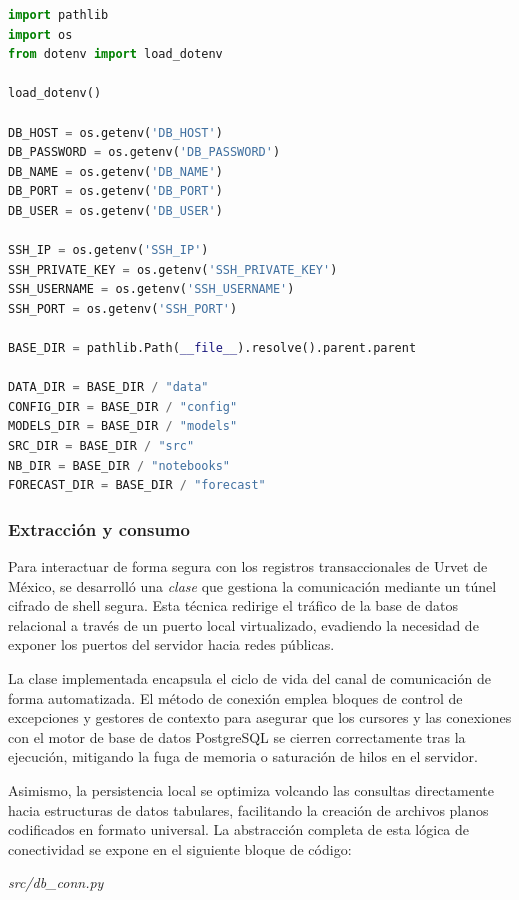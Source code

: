 \documentclass[11pt,a4paper]{report}
\begin{document}
        \begin{lstlisting}[language=Python, caption=Configuración de entornos y rutas globales en settings.py.]
import pathlib
import os
from dotenv import load_dotenv

load_dotenv()

DB_HOST = os.getenv('DB_HOST')
DB_PASSWORD = os.getenv('DB_PASSWORD')
DB_NAME = os.getenv('DB_NAME')
DB_PORT = os.getenv('DB_PORT')
DB_USER = os.getenv('DB_USER')

SSH_IP = os.getenv('SSH_IP')
SSH_PRIVATE_KEY = os.getenv('SSH_PRIVATE_KEY')
SSH_USERNAME = os.getenv('SSH_USERNAME')
SSH_PORT = os.getenv('SSH_PORT')

BASE_DIR = pathlib.Path(__file__).resolve().parent.parent

DATA_DIR = BASE_DIR / "data"
CONFIG_DIR = BASE_DIR / "config"
MODELS_DIR = BASE_DIR / "models"
SRC_DIR = BASE_DIR / "src"
NB_DIR = BASE_DIR / "notebooks"
FORECAST_DIR = BASE_DIR / "forecast"
        \end{lstlisting}

    \subsubsection{Extracción y consumo}
    Para interactuar de forma segura con los registros transaccionales de Urvet de México,
    se desarrolló una \textit{clase} que gestiona la comunicación mediante un túnel cifrado de shell segura.
    Esta técnica redirige el tráfico de la base de datos relacional a través de un puerto local virtualizado,
    evadiendo la necesidad de exponer los puertos del servidor hacia redes públicas.

    La clase implementada encapsula el ciclo de vida del canal de comunicación de forma automatizada.
    El método de conexión emplea bloques de control de excepciones y gestores de contexto para asegurar que los cursores y
    las conexiones con el motor de base de datos PostgreSQL se cierren correctamente tras la ejecución, mitigando la fuga de
    memoria o saturación de hilos en el servidor.
    
    Asimismo, la persistencia local se optimiza volcando las consultas directamente
    hacia estructuras de datos tabulares, facilitando la creación de archivos planos codificados en formato universal.
    La abstracción completa de esta lógica de conectividad se expone en el siguiente bloque de código:

    \textit{src/db\_conn.py}
\end{document}

